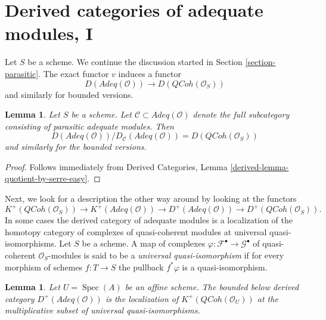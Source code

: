 \documentclass{stacks-project}
\theoremstyle{plain}
\newtheorem{lemma}[subsection]{Lemma}
\theoremstyle{definition}
\theoremstyle{remark}
\numberwithin{equation}{subsection}
\def\Spec{\mathop{\mathrm{Spec}}}
\def\QCoh{\mathit{QCoh}}
\begin{document}
\section{Derived categories of adequate modules, I}
\label{section-comparison}


\noindent
Let $S$ be a scheme. We continue the discussion started in
Section \ref{section-parasitic}.
The exact functor $v$ induces a functor
$$
D(\textit{Adeq}(\mathcal{O}))
\longrightarrow
D(\QCoh(\mathcal{O}_S))
$$
and similarly for bounded versions.

\begin{lemma}
\label{lemma-quotient-easy}
Let $S$ be a scheme. Let
$\mathcal{C} \subset \textit{Adeq}(\mathcal{O})$ denote the
full subcategory consisting of parasitic adequate modules.
Then
$$
D(\textit{Adeq}(\mathcal{O}))/D_\mathcal{C}(\textit{Adeq}(\mathcal{O}))
= D(\QCoh(\mathcal{O}_S))
$$
and similarly for the bounded versions.
\end{lemma}

\begin{proof}
Follows immediately from
Derived Categories, Lemma \ref{derived-lemma-quotient-by-serre-easy}.
\end{proof}

\noindent
Next, we look for a description the other way around by looking at
the functors
$$
K^+(\QCoh(\mathcal{O}_S))
\longrightarrow
K^+(\textit{Adeq}(\mathcal{O}))
\longrightarrow
D^+(\textit{Adeq}(\mathcal{O}))
\longrightarrow
D^+(\QCoh(\mathcal{O}_S)).
$$
In some cases the derived category of adequate modules is a localization
of the homotopy category of complexes of quasi-coherent modules at
universal quasi-isomorphisms. Let $S$ be a scheme. A map of complexes
$\varphi : \mathcal{F}^\bullet \to \mathcal{G}^\bullet$
of quasi-coherent $\mathcal{O}_S$-modules is said to be a
{\it universal quasi-isomorphism} if for every morphism of schemes
$f : T \to S$ the pullback $f^*\varphi$ is a quasi-isomorphism.

\begin{lemma}
\label{lemma-describe-Dplus-adequate}
Let $U = \Spec(A)$ be an affine scheme.
The bounded below derived category
$D^+(\textit{Adeq}(\mathcal{O}))$ is the localization
of $K^+(\QCoh(\mathcal{O}_U))$ at the multiplicative subset of
universal quasi-isomorphisms.
\end{lemma}
\end{document}
